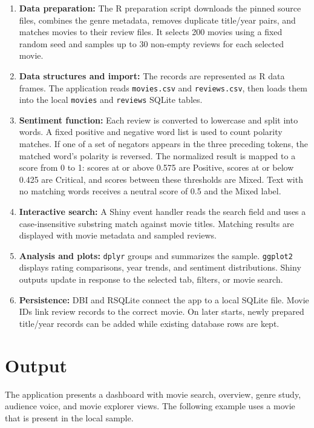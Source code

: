\documentclass[12pt,a4paper]{report}
\begin{document}
\begin{enumerate}
  \item \textbf{Data preparation:} The R preparation script downloads the pinned source files, combines the genre metadata, removes duplicate title/year pairs, and matches movies to their review files. It selects 200 movies using a fixed random seed and samples up to 30 non-empty reviews for each selected movie.
  \item \textbf{Data structures and import:} The records are represented as R data frames. The application reads \texttt{movies.csv} and \texttt{reviews.csv}, then loads them into the local \texttt{movies} and \texttt{reviews} SQLite tables.
  \item \textbf{Sentiment function:} Each review is converted to lowercase and split into words. A fixed positive and negative word list is used to count polarity matches. If one of a set of negators appears in the three preceding tokens, the matched word's polarity is reversed. The normalized result is mapped to a score from 0 to 1: scores at or above 0.575 are Positive, scores at or below 0.425 are Critical, and scores between these thresholds are Mixed. Text with no matching words receives a neutral score of 0.5 and the Mixed label.
  \item \textbf{Interactive search:} A Shiny event handler reads the search field and uses a case-insensitive substring match against movie titles. Matching results are displayed with movie metadata and sampled reviews.
  \item \textbf{Analysis and plots:} \texttt{dplyr} groups and summarizes the sample. \texttt{ggplot2} displays rating comparisons, year trends, and sentiment distributions. Shiny outputs update in response to the selected tab, filters, or movie search.
  \item \textbf{Persistence:} DBI and RSQLite connect the app to a local SQLite file. Movie IDs link review records to the correct movie. On later starts, newly prepared title/year records can be added while existing database rows are kept.
\end{enumerate}

\chapter{Output}
The application presents a dashboard with movie search, overview, genre study, audience voice, and movie explorer views. The following example uses a movie that is present in the local sample.
\end{document}
